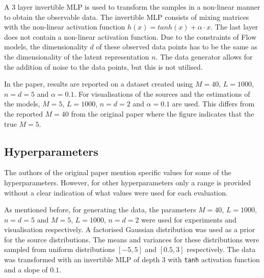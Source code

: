 A 3 layer invertible MLP is used to transform the samples in a non-linear manner to obtain the observable data. The invertible MLP consists of mixing matrices with the non-linear activation function $h(x)=tanh(x)+\alpha\cdot x$. The last layer does not contain a non-linear activation function. Due to the constraints of Flow models, the dimensionality $d$ of these observed data points has to be the same as the dimensionality of the latent representation $n$. The data generator allows for the addition of noise to the data points, but this is not utilised.

In the paper, results are reported on a dataset created using $M = 40$, $L = 1000$, $n = d = 5$ and $\alpha=0.1$. For visualisations of the sources and the estimations of the models, $M = 5$, $L = 1000$, $n = d = 2$ and $\alpha=0.1$ are used. This differs from the reported $M = 40$ from the original paper where the figure indicates that the true $M = 5$.

\subsection{Hyperparameters}
The authors of the original paper mention specific values for some of the hyperparameters. However, for other hyperparameters only a range is provided without a clear indication of what values were used for each evaluation.

As mentioned before, for generating the data, the parameters $M = 40$, $L = 1000$, $n = d = 5$ and $M = 5$, $L = 1000$, $n = d = 2$ were used for experiments and visualisation respectively. A factorised Gaussian distribution was used as a prior for the source distributions. The means and variances for these distributions were sampled from uniform distributions $[-5,5]$ and $[0.5,3]$ respectively. The data was transformed with an invertible MLP of depth 3 with \texttt{tanh} activation function and a slope of $0.1$.


